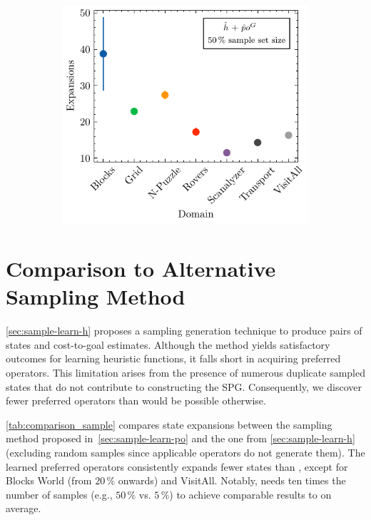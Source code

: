 \documentclass[ppgc,diss,english]{iiufrgs}
\begin{document}
\begin{figure}
  \vspace{0.5cm}

  \begin{subfigure}{0.41\textwidth}
    \centering
    \includegraphics[width=\linewidth]{img/error_hNN_poG_50pct.pdf}
  \end{subfigure}
  \label{fig:errors}
\end{figure}


\section{Comparison to Alternative Sampling Method}
\label{sec:exp-comparison-sample-method}
\cref{sec:sample-learn-h} proposes a sampling generation technique to produce pairs of states and cost-to-goal estimates. Although the method yields satisfactory outcomes for learning heuristic functions, it falls short in acquiring preferred operators.
This limitation arises from the presence of numerous duplicate sampled states that do not contribute to constructing the SPG. Consequently, we discover fewer preferred operators than would be possible otherwise.

\cref{tab:comparison_sample} compares state expansions between the sampling method proposed in~\cref{sec:sample-learn-po} \pog and the one from \cref{sec:sample-learn-h} \pofsm (excluding random samples since applicable operators do not generate them). The learned preferred operators \pog consistently expands fewer states than \pofsm, except for Blocks World (from $20\,\%$ onwards) and VisitAll. Notably, \pofsm needs ten times the number of samples (e.g., $50\,\%$ vs. $5\,\%$) to achieve comparable results to \pog on average.
\end{document}
